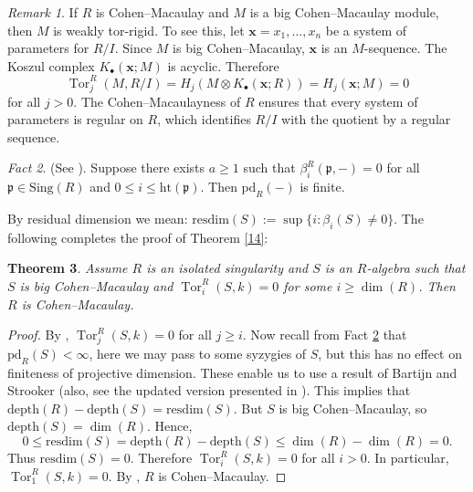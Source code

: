 \documentclass[11pt,a4paper]{amsart}
\numberwithin{equation}{section}
\newtheorem{theorem}{Theorem}[section]
\theoremstyle{definition}
\theoremstyle{remark}
\newtheorem{remark}[theorem]{Remark}
\newtheorem{fact}[theorem]{Fact}
\begin{document}
	
	\begin{remark}
		If \(R\) is Cohen--Macaulay and \(M\) is a big Cohen--Macaulay module, then \(M\) is weakly tor-rigid. To see this, let \(\mathbf{x}=x_1,\ldots,x_n\) be a system of parameters for \(R/I\). Since \(M\) is big Cohen--Macaulay, \(\mathbf{x}\) is an \(M\)-sequence. The Koszul complex \(K_\bullet(\mathbf{x};M)\) is acyclic. Therefore
		\[
		\operatorname{Tor}_j^R(M,R/I) = H_j(M\otimes K_\bullet(\mathbf{x};R)) = H_j(\mathbf{x};M)=0
		\]
		for all \(j>0\). The Cohen--Macaulayness of \(R\) ensures that every system of parameters is regular on \(R\), which identifies \(R/I\) with the quotient by a regular sequence.
	\end{remark}
	

	
	
	
	
	\begin{fact}\label{shh1}(See \cite[Theorem VI.10]{sc3}).	Suppose there exists \(a \ge 1\) such that
$
		\beta_i^R(\mathfrak{p}, -)=0
	$
		for all \(\mathfrak{p} \in \mathrm{Sing}(R)\) and \(0 \le i \le \mathrm{ht}(\mathfrak{p})\).
		Then \(\mathrm{pd}_R(-)\) is finite.\end{fact}

	
By residual dimension we  mean:	 $\mathrm{resdim}(S):=\sup\{i:\beta_i(S)\neq 0\}.$ 
	The following completes the proof of {Theorem} \ref{14}:
	\begin{theorem}\label{thm:isolated}
		Assume \(R\) is an isolated singularity and \(S\) is an \(R\)-algebra such that \(S\) is big Cohen--Macaulay and \(\operatorname{Tor}_i^R(S,k)=0\)  for some \(i \geq \dim(R)\). Then \(R\) is Cohen--Macaulay.
	\end{theorem}
	
\begin{proof}
By \cite[1.1]{IYENGAR}, \(\operatorname{Tor}_j^R(S,k)=0\) for all \(j \ge i\). Now recall from {Fact} \ref{shh1}
that \(\mathrm{pd}_R(S) < \infty\), here we may pass to some syzygies of $S$, but this has no effect on finiteness of projective dimension. These enable  us to use a result of  Bartijn and  Strooker \cite[4.1]{BS} (also, see the  updated version presented in \cite[7.4]{sc2}). This implies that \(\mathrm{depth}(R) - \mathrm{depth}(S) = \mathrm{resdim}(S)\). But \(S\) is big Cohen--Macaulay, so \(\mathrm{depth}(S)=\dim(R)\). Hence,
\[0 \le \mathrm{resdim}(S) = \mathrm{depth}(R)-\mathrm{depth}(S) \le \dim(R)-\dim(R)=0.
\]
Thus \(\mathrm{resdim}(S)=0\). Therefore \(\operatorname{Tor}_i^R(S,k)=0\) for all $i>0$.  In particular, \(\operatorname{Tor}_1^R(S,k)=0\).
By \cite[Proposition 2.5]{sc1}, \(R\) is Cohen--Macaulay.
\end{proof}
	
\end{document}
